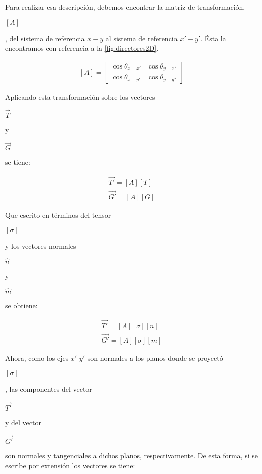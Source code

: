 \documentclass[12pt,letterpaper, twoside, openany]{article}
\begin{document}
Para realizar esa descripción, debemos encontrar la matriz de transformación, \begin{large} $\left[ A \right]$\end{large}, del sistema de referencia $x-y$ al sistema de referencia $x'-y'$. Ésta la encontramos con referencia a la \cref{fig:directores2D}.
%
\begin{large}
	\begin{align}
		\left[A\right]=
		\left[ \begin{array}{cc}
		\cos \theta_{x-x'} & \cos \theta_{y-x'} \\  
		\cos \theta_{x-y'} & \cos \theta_{y-y'}
		\end{array}  \right] 
		\label{eq:transfoma2D}
	\end{align}
\end{large}
%
Aplicando esta transformación sobre los vectores \begin{large} $\overset{\rightarrow}{T}$\end{large} y \begin{large} $\overset{\rightarrow}{G}$\end{large} se tiene: 
%
 \begin{large}
	\begin{align}
		\overset{\rightarrow}{T'}= \left[ A \right] \left[ T \right]\label{eq:Ttransf} \\
		\overset{\rightarrow}{G'}= \left[ A \right] \left[ G \right]\label{eq:Gtransf} 		
	\end{align}
\end{large}
%
Que escrito en términos del tensor  \begin{large} $\left[ \sigma \right]$\end{large} y los vectores normales \begin{large} $\hat{n}$\end{large} y \begin{large} $\hat{m}$\end{large} se obtiene: 
 \begin{large}
	\begin{align}
		\overset{\rightarrow}{T'}= \left[ A \right] \left[ \sigma \right] \left[ n \right]\label{eq:Ttransf0}\\
		\overset{\rightarrow}{G'}= \left[ A \right] \left[ \sigma \right] \left[ m\right]\label{eq:Gtransf0}
	\end{align}
\end{large}
%
Ahora,  como los ejes $x'$ $y'$ son normales a los planos donde se proyectó \begin{large} $\left[ \sigma \right]$\end{large}, las componentes del vector \begin{large} $\overset{\rightarrow}{T'}$\end{large} y del vector  \begin{large} $\overset{\rightarrow}{G'}$\end{large} son normales y tangenciales a dichos planos, respectivamente. De esta forma, si se escribe por extensión los vectores se tiene:
\end{document}
